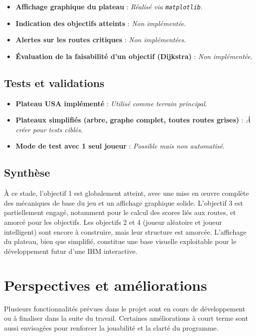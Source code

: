 \documentclass[a4paper,12pt]{report}
\begin{document}
\begin{itemize}
    \item \textbf{Affichage graphique du plateau} : \textit{Réalisé via \texttt{matplotlib}}.
    \item \textbf{Indication des objectifs atteints} : \textit{Non implémentée}.
    \item \textbf{Alertes sur les routes critiques} : \textit{Non implémentées}.
    \item \textbf{Évaluation de la faisabilité d’un objectif (Dijkstra)} : \textit{Non implémentée}.
\end{itemize}

\section*{Tests et validations}

\begin{itemize}
    \item \textbf{Plateau USA implémenté} : \textit{Utilisé comme terrain principal}.
    \item \textbf{Plateaux simplifiés (arbre, graphe complet, toutes routes grises)} : \textit{À créer pour tests ciblés}.
    \item \textbf{Mode de test avec 1 seul joueur} : \textit{Possible mais non automatisé}.
\end{itemize}

\section*{Synthèse}

À ce stade, l’objectif 1 est globalement atteint, avec une mise en œuvre complète des mécaniques de base du jeu et un affichage graphique solide.
L’objectif 3 est partiellement engagé, notamment pour le calcul des scores liés aux routes, et amorcé pour les objectifs.
Les objectifs 2 et 4 (joueur aléatoire et joueur intelligent) sont encore à construire, mais leur structure est amorcée.
L’affichage du plateau, bien que simplifié, constitue une base visuelle exploitable pour le développement futur d’une IHM interactive.

\chapter{Perspectives et améliorations}

Plusieurs fonctionnalités prévues dans le projet sont en cours de développement ou à finaliser dans la suite du travail. Certaines améliorations à court terme sont aussi envisagées pour renforcer la jouabilité et la clarté du programme.
\end{document}
